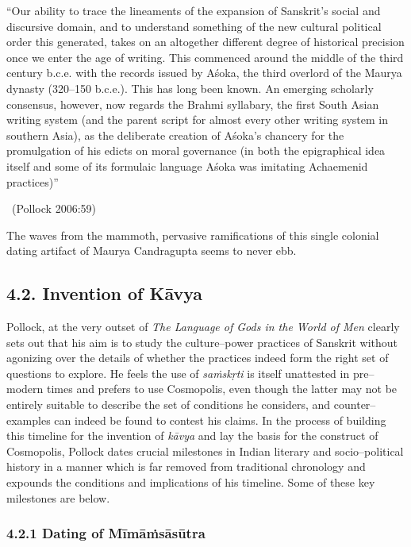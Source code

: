 \begin{myquote}
“Our ability to trace the lineaments of the expansion of Sanskrit’s social and discursive domain, and to understand something of the new cultural political order this generated, takes on an altogether different degree of historical precision once we enter the age of writing. This commenced around the middle of the third century b.c.e. with the records issued by Aśoka, the third overlord of the Maurya dynasty (320–150 b.c.e.). This has long been known. An emerging scholarly consensus, however, now regards the Brahmi syllabary, the first South Asian writing system (and the parent script for almost every other writing system in southern Asia), as the deliberate creation of Aśoka’s chancery for the promulgation of his edicts on moral governance (in both the epigraphical idea itself and some of its formulaic language Aśoka was imitating Achaemenid practices)” 

~\hfill (Pollock 2006:59)
\end{myquote}

The waves from the mammoth, pervasive ramifications of this single colonial dating artifact of Maurya Candragupta seems to never ebb.


\subsection*{4.2. Invention of Kāvya}

Pollock, at the very outset of \textit{The Language of Gods in the World of Men} clearly sets out that his aim is to study the culture–power practices of Sanskrit without agonizing over the details of whether the practices indeed form the right set of questions to explore. He feels the use of \textit{saṁskṛti} is itself unattested in pre–modern times and prefers to use Cosmopolis, even though the latter may not be entirely suitable to describe the set of conditions he considers, and counter–examples can indeed be found to contest his claims. In the process of building this timeline for the invention of \textit{kāvya} and lay the basis for the construct of Cosmopolis, Pollock dates crucial milestones in Indian literary and socio–political history in a manner which is far removed from traditional chronology and expounds the conditions and implications of his timeline. Some of these key milestones are below.

\subsubsection*{4.2.1 Dating of Mīmāṁsāsūtra}

